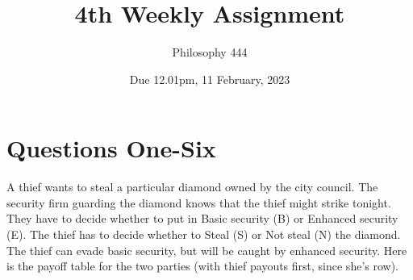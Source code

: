 \documentclass[
  11pt,
]{article}
\title{4th Weekly Assignment}
\author{Philosophy 444}
\date{Due 12.01pm, 11 February, 2023}
\begin{document}
\maketitle

\hypertarget{questions-one-six}{%
\section{Questions One-Six}\label{questions-one-six}}

A thief wants to steal a particular diamond owned by the city council.
The security firm guarding the diamond knows that the thief might strike
tonight. They have to decide whether to put in Basic security (B) or
Enhanced security (E). The thief has to decide whether to Steal (S) or
Not steal (N) the diamond. The thief can evade basic security, but will
be caught by enhanced security. Here is the payoff table for the two
parties (with thief payouts first, since she's row).

 
  \providecommand{\huxb}[2]{\arrayrulecolor[RGB]{#1}\global\arrayrulewidth=#2pt}
  \providecommand{\huxvb}[2]{\color[RGB]{#1}\vrule width #2pt}
  \providecommand{\huxtpad}[1]{\rule{0pt}{#1}}
  \providecommand{\huxbpad}[1]{\rule[-#1]{0pt}{#1}}
\end{document}
